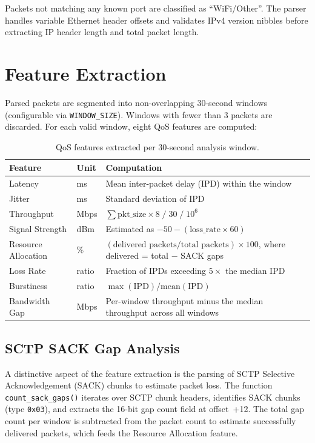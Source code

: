 \documentclass[11pt, a4paper]{article}
\begin{document}
Packets not matching any known port are classified as ``WiFi/Other''. The parser handles variable Ethernet header offsets and validates IPv4 version nibbles before extracting IP header length and total packet length.

\section{Feature Extraction}

Parsed packets are segmented into non-overlapping 30-second windows (configurable via \texttt{WINDOW\_SIZE}). Windows with fewer than 3 packets are discarded. For each valid window, eight QoS features are computed:

\begin{table}[H]
\centering
\begin{tabular}{l l p{7.5cm}}
\toprule
\textbf{Feature} & \textbf{Unit} & \textbf{Computation} \\
\midrule
Latency        & ms    & Mean inter-packet delay (IPD) within the window \\
Jitter         & ms    & Standard deviation of IPD \\
Throughput     & Mbps  & $\sum \text{pkt\_size} \times 8 \;/\; 30 \;/\; 10^6$ \\
Signal Strength & dBm  & Estimated as $-50 - (\text{loss\_rate} \times 60)$ \\
Resource Allocation & \%  & $(\text{delivered packets} / \text{total packets}) \times 100$, where delivered = total $-$ SACK gaps \\
Loss Rate      & ratio & Fraction of IPDs exceeding $5\times$ the median IPD \\
Burstiness     & ratio & $\max(\text{IPD}) / \text{mean}(\text{IPD})$ \\
Bandwidth Gap  & Mbps  & Per-window throughput minus the median throughput across all windows \\
\bottomrule
\end{tabular}
\caption{QoS features extracted per 30-second analysis window.}
\label{tab:features}
\end{table}

\subsection{SCTP SACK Gap Analysis}

A distinctive aspect of the feature extraction is the parsing of SCTP Selective Acknowledgement (SACK) chunks to estimate packet loss. The function \texttt{count\_sack\_gaps()} iterates over SCTP chunk headers, identifies SACK chunks (type \texttt{0x03}), and extracts the 16-bit gap count field at offset~+12. The total gap count per window is subtracted from the packet count to estimate successfully delivered packets, which feeds the Resource Allocation feature.
\end{document}
